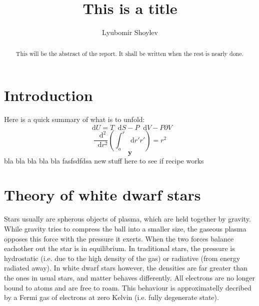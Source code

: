 \documentclass[]{article}
\newcommand{\dd}{\mathop{}\!\mathrm{d}}
\renewcommand{\vec}[1]{\boldsymbol{#1}}
\begin{document}
\title{This is a title}
\author{Lyubomir Shoylev}

\maketitle

\begin{abstract}
	This will be the abstract of the report. It shall be written when the rest is nearly done.
\end{abstract}

\section{Introduction}
Here is a quick summary of what is to unfold:
\begin{equation}
	\dd U = T\dd S - P \dd V - P \partial V
\end{equation}
\begin{equation}
	\frac{\dd^2}{\dd r^2}\left(\int_{a}^{r} \dd r' r'\right) = r^2
\end{equation}
\begin{equation}
	\vec{y}
\end{equation}
bla bla bla bla bla fasfsdfdsa
new stuff here to see if recipe works



\section{Theory of white dwarf stars}
Stars usually are spherous objects of plasma, which are held together by gravity. While gravity tries to compress the ball into a smaller size, the gaseous plasma opposes this force with the pressure it exerts. When the two forces balance eachother out the star is in equilibrium. In traditional stars, the pressure is hydrostatic (i.e. due to the high density of the gas) or radiative (from energy radiated away). In white dwarf stars however, the densities are far greater than the ones in usual stars, and matter behaves differently. All electrons are no longer bound to atoms and are free to roam. This behaviour is approximatelly decribed by a Fermi gas of electrons at zero Kelvin (i.e. fully degenerate state).
\end{document}
